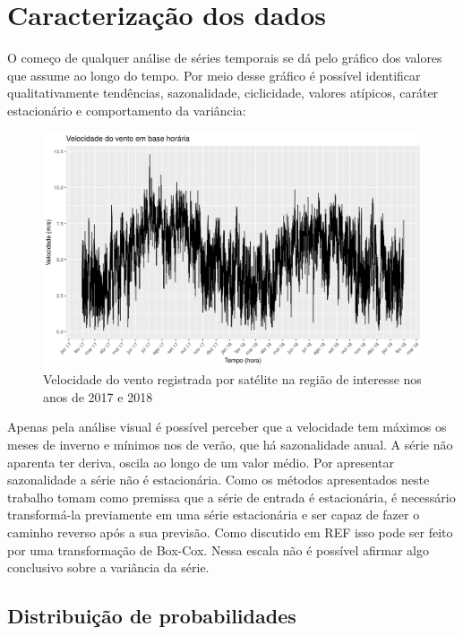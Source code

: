 \documentclass[
	12pt,				%
	openright,			%
	oneside,			%
	a4paper,			%
	english,			%
	french,				%
	spanish,			%
	brazil				%
	]{abntex2}
\begin{document}
\chapter{Caracterização dos dados}

O começo de qualquer análise de séries temporais se dá pelo gráfico dos valores que assume ao longo do tempo. Por meio desse gráfico é possível identificar qualitativamente tendências, sazonalidade, ciclicidade, valores atípicos, caráter estacionário e comportamento da variância:

\begin{figure}[h]
    \centering
	\includegraphics[width=\textwidth]{entire_series_hourly_basis.png}
	\caption{Velocidade do vento registrada por satélite na região de interesse nos anos de 2017 e 2018}
\end{figure}
\FloatBarrier

Apenas pela análise visual é possível perceber que a velocidade tem máximos os meses de inverno e mínimos nos de verão, que há sazonalidade anual. A série não aparenta ter deriva, oscila ao longo de um valor médio. Por apresentar sazonalidade a série não é estacionária. Como os métodos apresentados neste trabalho tomam como premissa que a série de entrada é estacionária, é necessário transformá-la previamente em uma série estacionária e ser capaz de fazer o caminho reverso após a sua previsão. Como discutido em REF isso pode ser feito por uma transformação de Box-Cox. Nessa escala não é possível afirmar algo conclusivo sobre a variância da série.

\section{Distribuição de probabilidades}
\end{document}
